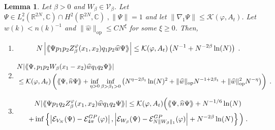 \documentclass[11pt, english, american]{article}
\newcommand{\laa}{\langle\hspace{-0.08cm}\langle}
\newcommand{\raa}{\rangle\hspace{-0.08cm}\rangle}
\newtheorem{lemma}[theorem]{Lemma}
\renewcommand{\phi}{\varphi}
\newcommand{\potdiff}{Z}
\begin{document}
\begin{lemma}\label{hnorms}%
Let $\beta >0$ and $W_\beta\in\mathcal{V}_\beta$. 
Let $\Psi  \in L^2_{s}(\mathbb{R}^{2N}, \mathbb{C}) \cap H^2(\mathbb{R}^{2N}, \mathbb{C}) \; , \| \Psi \|=1$
and let $\|\nabla_1\Psi\|
\leq \mathcal{K}(\phi, A_t)$.
Let $w(k)<n(k)^{-1}$ and $\| \widehat{w}\|_{\text{op}} \leq C N^{ \xi}$ for some $\xi \geq 0$. Then,
\begin{enumerate}
\item   $$N\left|\laa\Psi p_1p_2
\potdiff^\phi_\beta(x_1,x_2) q_1p_2\widehat{w}\Psi\raa\right|\leq   
\mathcal{K}(\phi, A_t)
 \left( N^{-1}+   N^{- 2 \beta } \ln(N) \right)
\;.
$$

\item 
 \begin{align*} 
 & N|\laa\Psi, p_1p_2
  W_{\beta}(x_1-x_2)
  \widehat{w}q_1q_2\Psi\raa|
  \nonumber
\\ 
 & \leq 
\mathcal{K}(\phi, A_t)
	\left(
		\laa \Psi, \widehat{n} \Psi \raa 
		 +
		  \inf_{\eta>0}
  \inf_{\beta>\beta_1 >0}
  \left(
 			N^{ \eta- 2 \beta_1} \ln(N)^2
 				 +\| \widehat{w}\|_{\text{op}} N^{-1+2 \beta_1}
+
\| \widehat{w}\|_{\text{op}}^2  N^{ - \eta}
\right)  
\right) 
\;.
\end{align*}

\item
\begin{align*} &N|\laa\Psi p_1q_2\potdiff^\phi_\beta(x_1,x_2)\widehat{w}q_1q_2\Psi\raa|
\leq 
\mathcal{K}(\phi, A_t)
\Big(
\laa\Psi,\widehat{n}\Psi\raa+ N^{-1/6} \ln(N)
\\
+&
\inf \left\lbrace 
\left|\mathcal{E}_{V_N}(\Psi)-\mathcal{E}_{4 \pi}^{GP}(\phi)\right|,
\left|\mathcal{E}_{W_\beta}(\Psi)-\mathcal{E}_{N \|W_\beta\|_1}^{GP}(\phi)\right|+ N^{-2 \beta} \ln(N)
\right\rbrace
\Big)
\;.
\end{align*}

\end{enumerate}
\end{lemma}
\end{document}
